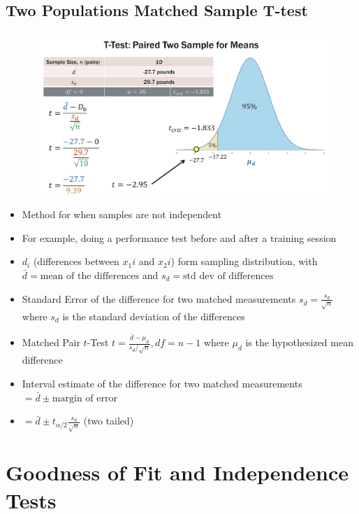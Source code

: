 \documentclass{article}
\begin{document}
\subsection{Two Populations Matched Sample T-test}

\begin{figure}[H]
        \centering
        \includegraphics[width=1\linewidth]{matchedtexample.png}
    \end{figure}

\begin{itemize}
    \item Method for when samples are not independent
    \item For example, doing a performance test before and after a training session
    \item $d_i$ (differences between $x_1i$ and $x_2i$) form sampling distribution, with $\bar{d}=\text{mean of the differences}$ and $s_d=\text{std dev of differences}$ 
    \item Standard Error of the difference for two matched measurements $s_{\bar{d}}=\frac{s_d}{\sqrt{n}}$ where $s_d$ is the standard deviation of the differences
    \item Matched Pair $t$-Test $t=\frac{\bar{d}-\mu_d}{s_d/\sqrt{n}}, df=n-1$ where $\mu_d$ is the hypothesized mean difference
    \item Interval estimate of the difference for two matched measurements $=\bar{d} \pm \text{margin of error}$
    \item $=\bar{d} \pm t_{\alpha/2} \frac{s_d}{\sqrt{n}}$ (two tailed)
\end{itemize}

\section{Goodness of Fit and Independence Tests}
\end{document}
